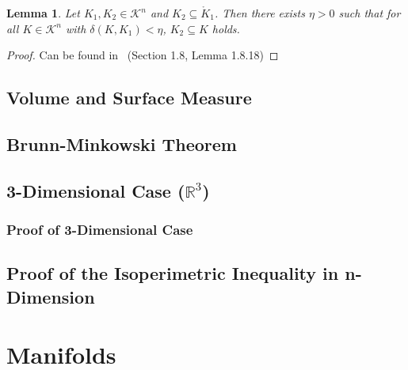 \documentclass[a4paper]{book}
\newtheorem{lemma}[theorem]{Lemma}%
\begin{document}
\begin{lemma}
    Let $K_{1},K_{2}\in\mathscr{K}^{n}$ and $K_{2}\subseteq\mathring{K}_{1}$. Then there exists $\eta>0$ such that for all $K\in\mathscr{K}^{n}$ with $\delta(K,K_{1})<\eta$, $K_{2}\subseteq K$ holds.
\end{lemma}
\begin{proof}
    Can be found in~\cite{schneider2014convex} (Section 1.8, Lemma 1.8.18)
\end{proof}
    
\section{Volume and Surface Measure}
\section{Brunn-Minkowski Theorem}
\section{3-Dimensional Case ($\mathbb{R}^3$)}
\subsection{Proof of 3-Dimensional Case}
\section{Proof of the Isoperimetric Inequality in n-Dimension}

\chapter{Manifolds}



\end{document}
